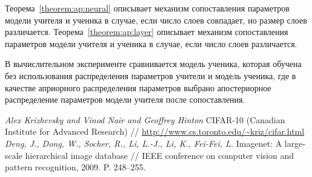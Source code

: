 \documentclass[12pt]{a&t}
\begin{document}
Теорема~\ref{theorem:ap:neural} описывает механизм сопоставления параметров модели учителя и ученика в случае, если число слоев совпадает, но размер слоев различается. Теорема~\ref{theorem:ap:layer} описывает механизм сопоставления параметров модели учителя и ученика в случае, если число слоев различается.

В вычислительном эксперименте сравнивается модель ученика, которая обучена без использования распределения параметров учители и модель ученика, где в качестве априорного распределения параметров выбрано апостериорное распределение параметров модели учителя после сопоставления.

\begin{thebibliography}{10}
	\textit{Alex Krizhevsky and Vinod Nair and Geoffrey Hinton} CIFAR-10 (Canadian Institute for Advanced Research) // \url{http://www.cs.toronto.edu/~kriz/cifar.html}
	\textit{Deng, J., Dong, W., Socher, R., Li, L.-J., Li, K., Fei-Fei, L. } Imagenet: A large-scale hierarchical image database //  IEEE conference on computer vision and pattern recognition, 2009. P. 248--255. 
	

\end{thebibliography}
\end{document}
